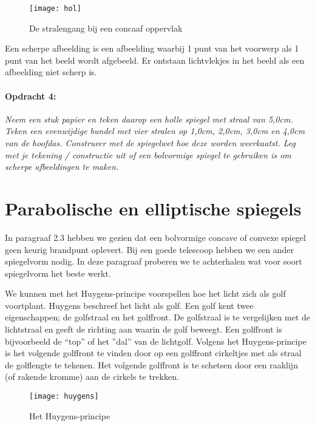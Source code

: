 \begin{figure}[H]
\noindent \begin{centering}
\texttt{[image: hol]}
\par\end{centering}

\caption{De stralengang bij een concaaf oppervlak}
\end{figure}


Een scherpe afbeelding is een afbeelding waarbij 1 punt van het voorwerp
als 1 punt van het beeld wordt afgebeeld. Er ontstaan lichtvlekjes
in het beeld als een afbeelding niet scherp is.

\paragraph*{Opdracht 4:}

\emph{Neem een stuk papier en teken daarop een holle spiegel met straal
van 5,0cm. Teken een evenwijdige bundel met vier stralen op 1,0cm,
2,0cm, 3,0cm en 4,0cm van de hoofdas. Construeer met de spiegelwet
hoe deze worden weerkaatst. Leg met je tekening / constructie uit
of een bolvormige spiegel te gebruiken is om scherpe afbeeldingen
te maken. }


\section{Parabolische en elliptische spiegels}

In paragraaf 2.3 hebben we gezien dat een bolvormige concave of convexe
spiegel geen keurig brandpunt oplevert. Bij een goede telescoop hebben
we een ander spiegelvorm nodig. In deze paragraaf proberen we te achterhalen
wat voor soort spiegelvorm het beste werkt.

We kunnen met het Huygens-principe voorspellen hoe het licht zich
als golf voortplant. Huygens beschreef het licht als golf. Een golf
kent twee eigenschappen; de golfstraal en het golffront. De golfstraal
is te vergelijken met de lichtstraal en geeft de richting aan waarin
de golf beweegt. Een golffront is bijvoorbeeld de ``top'' of het
''dal'' van de lichtgolf. Volgens het Huygens-principe is het volgende
golffront te vinden door op een golffront cirkeltjes met als straal
de golflengte te tekenen. Het volgende golffront is te schetsen door
een raaklijn (of rakende kromme) aan de cirkels te trekken.

\begin{figure}[H]
\noindent \begin{centering}
\texttt{[image: huygens]}
\par\end{centering}

\caption{Het Huygens-principe}
\end{figure}


